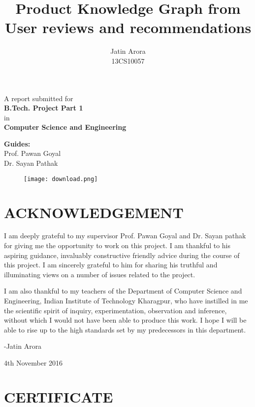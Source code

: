\documentclass[12pt]{article}
\title{Product Knowledge Graph from User reviews and recommendations}
\author{Jatin Arora \\ 13CS10057}
\begin{document}
\maketitle
\begin{center}
A report submitted for \\
\textbf{B.Tech. Project Part 1}	\\
in \\
\textbf{Computer Science and Engineering}  \\  
\end{center}
\begin{center}
\textbf{Guides:}\\
Prof. Pawan Goyal\\
Dr. Sayan Pathak\\
\end{center}
\begin{figure}
\centering
\texttt{[image: download.png]}

\end{figure}


\pagebreak

\section*{ ACKNOWLEDGEMENT \centering }
\vspace{20px}
I am deeply grateful to my supervisor Prof. Pawan Goyal  and Dr. Sayan pathak for giving me the opportunity to work on this project. I am thankful to his aspiring guidance, invaluably constructive friendly advice during the course of this project. I am sincerely grateful to him for sharing his truthful and illuminating views on a number of issues related to the project.

I am also thankful to my teachers of the Department of Computer Science and Engineering, Indian Institute of Technology Kharagpur, who have instilled in me the scientific spirit of inquiry, experimentation, observation and inference, without which I would not have been able to produce this work. I hope I will be able to rise up to the high standards set by my predecessors in this department. 
\vspace{20px}

-Jatin Arora

4th November 2016
\pagebreak



\section*{CERTIFICATE \centering }
\end{document}
